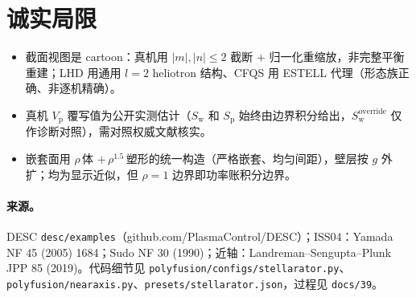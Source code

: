 \documentclass[UTF8,11pt]{ctexart}
\newcommand{\Vp}{V_\mathrm{p}}
\newcommand{\Sw}{S_\mathrm{w}}
\newcommand{\Sp}{S_\mathrm{p}}
\begin{document}
\section{诚实局限}
\begin{itemize}
\item 截面视图是 cartoon：真机用 $|m|,|n|\le2$ 截断 + 归一化重缩放，非完整平衡重建；LHD 用通用 $l{=}2$ heliotron 结构、CFQS 用 ESTELL 代理（形态族正确、非逐机精确）。
\item 真机 $\Vp$ 覆写值为公开实测估计（$\Sw$ 和 $\Sp$ 始终由边界积分给出，$\Sw^\mathrm{override}$ 仅作诊断对照），需对照权威文献核实。
\item 嵌套面用 $\rho\,$体 $+\,\rho^{1.5}\,$塑形的统一构造（严格嵌套、均匀间距），壁层按 $g$ 外扩；均为显示近似，但 $\rho{=}1$ 边界即功率账积分边界。
\end{itemize}

\paragraph{来源。}DESC \texttt{desc/examples}（github.com/PlasmaControl/DESC）；ISS04：Yamada NF 45 (2005) 1684；Sudo NF 30 (1990)；近轴：Landreman–Sengupta–Plunk JPP 85 (2019)。代码细节见 \texttt{polyfusion/configs/stellarator.py}、\texttt{polyfusion/nearaxis.py}、\texttt{presets/stellarator.json}，过程见 \texttt{docs/39}。
\end{document}
